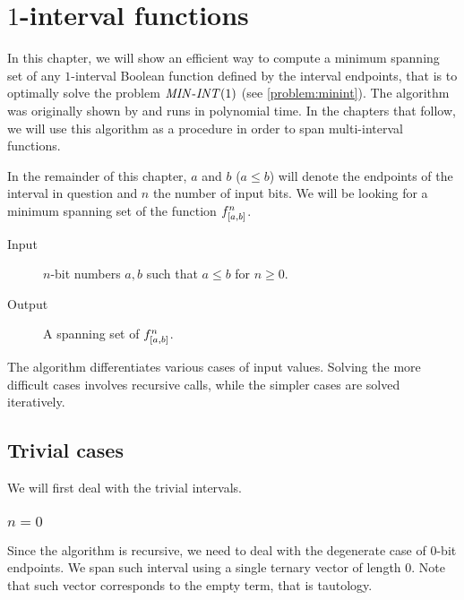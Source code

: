 \chapter{\texorpdfstring{$1$}{1}-interval functions}
\label{chap:1interval}

In this chapter,
we will show an efficient way to compute
a minimum spanning set of any $1$-interval Boolean function
defined by the interval endpoints,
that is to optimally solve the problem
$\mathit{MIN\text{-}INT} (1)$
(see \cref{problem:minint}).
The algorithm was originally shown by
\citet{Schieber2005154}
and runs in polynomial time.
In the chapters that follow,
we will use this algorithm as a procedure
in order to span multi-interval functions.

In the remainder of this chapter,
$a$ and $b$ ($a \leq b$) will denote the endpoints
of the interval in question
and $n$ the number of input bits.
We will be looking for a minimum spanning set
of the function $f^{n}_{[a, b]}$.


\begin{description}
\item[Input] $n$-bit numbers $a, b$ such that $a \leq b$ for $n \geq 0$.
\item[Output] A spanning set of $f^{n}_{[a, b]}$.
\end{description}

The algorithm differentiates various cases
of input values.
Solving the more difficult cases involves recursive calls,
while the simpler cases are solved iteratively.

\section{Trivial cases}

We will first deal with the trivial intervals.

\subsection{\texorpdfstring{$n=0$}{n=0}}

Since the algorithm is recursive,
we need to deal with the degenerate case
of $0$-bit endpoints.
We span such interval using a single ternary vector
of length $0$.
Note that such vector corresponds to the empty term,
that is tautology.

